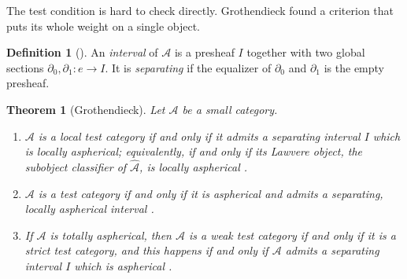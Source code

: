 \documentclass[11pt]{amsart}
\newtheorem{theorem}[teo]{Theorem}
\theoremstyle{definition}
\newtheorem{definition}[teo]{Definition}
\theoremstyle{remark}
\numberwithin{figure}{section}%
\newcommand{\A}{\mathcal{A}}
\begin{document}
The test condition is hard to check directly. Grothendieck found a criterion that puts its whole weight on a single object.

\begin{definition}[{\cite[1.4.1]{Malt}}]\label{def:interval}
An \emph{interval} of $\A$ is a presheaf $I$ together with two global sections $\partial_0,\partial_1\colon e\to I$. It is \emph{separating} if the equalizer of $\partial_0$ and $\partial_1$ is the empty presheaf.
\end{definition}

\begin{theorem}[Grothendieck]
\label{thm:interval}
Let $\A$ be a small category.
\begin{enumerate}[leftmargin=*]
\item $\A$ is a local test category if and only if it admits a separating interval $I$ which is locally aspherical; equivalently, if and only if its Lawvere object, the subobject classifier of $\widehat{\A}$, is locally aspherical \cite[Thm.~1.5.6]{Malt}.
\item $\A$ is a test category if and only if it is aspherical and admits a separating, locally aspherical interval \cite[Rem.~1.5.4]{Malt}.
\item If $\A$ is totally aspherical, then $\A$ is a weak test category if and only if it is a strict test category, and this happens if and only if $\A$ admits a separating interval $I$ which is aspherical \cite[Prop.~1.6.8]{Malt}.
\end{enumerate}
\end{theorem}
\end{document}
